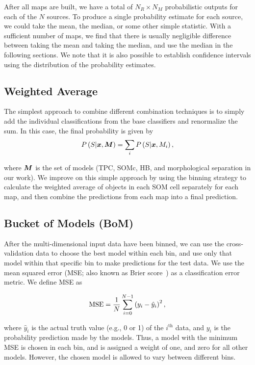 \documentclass[useAMS,usenatbib]{mn2e}
\newcommand{\eg}{{e.g., }}
\begin{document}
After all maps are built,
we have a total of $N_R \times N_M$ probabilistic outputs
for each of the $N$ sources.
To produce a single probability estimate for each source,
we could take the mean, the median, or some other simple statistic.
With a sufficient number of maps,
we find that there is usually negligible difference
between taking the mean and taking the median, and
use the median in the following sections.
We note that it is also possible to establish confidence intervals
using the distribution of the probability estimates.

\subsection{Weighted Average}

The simplest approach to combine different combination techniques is
to simply add the individual classifications from the base classifiers
and renormalize the sum.
In this case, the final probability is given by
\begin{equation}
P\left(S | \bmath{x}, \bmath{M} \right)
= \sum_{i} P \left( S | \bmath{x}, M_{i} \right),
\end{equation}

\noindent
where $\bmath{M}$ is the set of models
(TPC, SOMc, HB, and morphological separation
in our work).
We improve on this simple approach
by using the binning strategy to
calculate the weighted average of objects in each SOM cell
separately for each map,
and then combine the predictions from each map into a final prediction.


\subsection{Bucket of Models (BoM)}

After the multi-dimensional input data have been binned,
we can use the cross-validation data
to choose the best model within each bin,
and use only that model within that specific bin
to make predictions for the test data.
We use the mean squared error
(MSE; also known as Brier score~\citep{brier1950verification})
as a classification error metric. We define MSE as

\begin{equation} \label{eq:mse}
  {\mathrm{MSE}} = \frac{1}{N} \sum^{N - 1}_{i = 0}
  \left( y_i - \hat{y}_i \right)^2,
\end{equation}

\noindent
where $\hat{y}_i$ is the actual truth value
(\eg 0 or 1) of the $i^{\text{th}}$ data, 
and $y_{i}$ is the probability prediction made by the models.
Thus, a model with the minimum MSE is chosen in each bin,
and is assigned a weight of one,
and zero for all other models.
However, the chosen model is allowed to vary between different bins.
\end{document}
